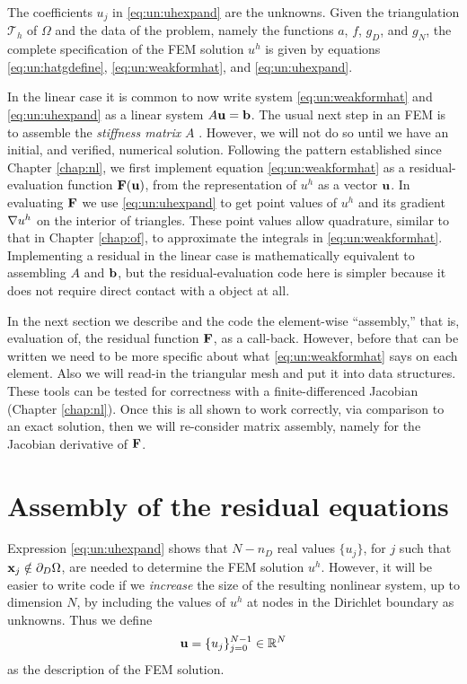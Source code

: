 The coefficients $u_j$ in \eqref{eq:un:uhexpand} are the unknowns.  Given the triangulation $\mathcal{T}_h$ of $\Omega$ and the data of the problem, namely the functions $a$, $f$, $g_D$, and $g_N$, the complete specification of the FEM solution $u^h$ is given by equations \eqref{eq:un:hatgdefine}, \eqref{eq:un:weakformhat}, and \eqref{eq:un:uhexpand}.

In the linear case it is common to now write system \eqref{eq:un:weakformhat} and \eqref{eq:un:uhexpand} as a linear system $A \mathbf{u} = \mathbf{b}$.  The usual next step in an FEM is to assemble the \emph{stiffness matrix} $A$ \citep{Elmanetal2005}.  However, we will not do so until we have an initial, and verified, numerical solution.  Following the pattern established since Chapter \ref{chap:nl}, we first implement equation \eqref{eq:un:weakformhat} as a residual-evaluation function $\mathbf{F}(\mathbf{u})$, from the representation of $u^h$ as a vector $\mathbf{u}$.  In evaluating $\mathbf{F}$ we use \eqref{eq:un:uhexpand} to get point values of $u^h$ and its gradient $\nabla u^h$ on the interior of triangles.  These point values allow quadrature, similar to that in Chapter \ref{chap:of}, to approximate the integrals in \eqref{eq:un:weakformhat}.  Implementing a residual in the linear case is mathematically equivalent to assembling $A$ and $\mathbf{b}$, but the residual-evaluation code here is simpler because it does not require direct contact with a \pMat object at all.

In the next section we describe and the code the element-wise ``assembly,'' that is, evaluation of, the residual function $\mathbf{F}$, as a \pSNES call-back.  However, before that can be written we need to be more specific about what \eqref{eq:un:weakformhat} says on each element.  Also we will read-in the triangular mesh and put it into \PETSc data structures.  These tools can be tested for correctness with a finite-differenced Jacobian (Chapter \ref{chap:nl}).  Once this is all shown to work correctly, via comparison to an exact solution, then we will re-consider matrix assembly, namely for the Jacobian derivative of $\mathbf{F}$.


\section{Assembly of the residual equations}

Expression \eqref{eq:un:uhexpand} shows that $N-n_D$ real values $\{u_j\}$, for $j$ such that $\mathbf{x}_j \notin \partial_D \Omega$, are needed to determine the FEM solution $u^h$.  However, it will be easier to write code if we \emph{increase} the size of the resulting nonlinear system, up to dimension $N$, by including the values of $u^h$ at nodes in the Dirichlet boundary as unknowns.  Thus we define
\begin{equation}
\mathbf{u} = \{u_j\}_{j=0}^{N-1} \in \mathbb{R}^N  \label{eq:un:unknowns}
\end{equation}
as the description of the FEM solution.

